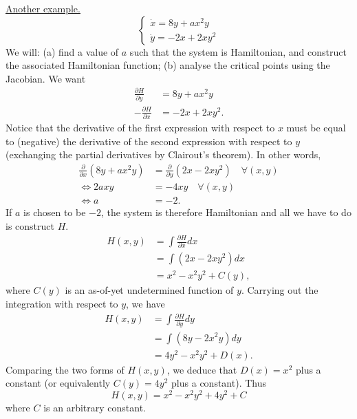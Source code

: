 \documentclass[11pt, letterpaper, oneside]{article}     %
\numberwithin{equation}{subsection}
\theoremstyle{definition}
\numberwithin{theorem}{section}
\theoremstyle{remark}
\begin{document}
\begin{enumerate}
  \medskip
  \underline{Another example.}
  \begin{equation}\label{eq:another-hamiltonian-system}
    \begin{cases}
      \dot x = 8y + ax^2y\\
      \dot y = -2x + 2xy^2
    \end{cases}
  \end{equation}
  We will: (a) find a value of $a$ such that the system is Hamiltonian, and construct the associated Hamiltonian function; (b) analyse the critical points using the Jacobian. We want
  \begin{align}
    \frac{\partial H}{\partial y} &= 8y + ax^2y\\
    -\frac{\partial H}{\partial x} &= -2x+2xy^2.
  \end{align}
  Notice that the derivative of the first expression with respect to $x$ must be equal to (negative) the derivative of the second expression with respect to $y$ (exchanging the partial derivatives by Clairout's theorem). In other words,
  \begin{align}
    \frac{\partial}{\partial x}\left(8y + ax^2y\right) &= \frac{\partial}{\partial y}\left(2x-2xy^2\right)\quad\forall (x,y)\\
    \iff 2axy &= -4xy\quad\forall(x,y)\\
    \iff a &= -2.
  \end{align}
  If $a$ is chosen to be $-2$, the system is therefore Hamiltonian and all we have to do is construct $H$.
  \begin{equation}
    \begin{split}
      H(x,y) &= \int\frac{\partial H}{\partial x}dx\\
      &= \int(2x-2xy^2)dx\\
      &= x^2 - x^2y^2 + C(y),
    \end{split}
  \end{equation}
  where $C(y)$ is an as-of-yet undetermined function of $y$. Carrying out the integration with respect to $y$, we have
  \begin{equation}
    \begin{split}
      H(x,y) &= \int\frac{\partial H}{\partial y}dy\\
      &= \int(8y - 2x^2y)dy\\
      &= 4y^2 - x^2y^2 + D(x).
    \end{split}
  \end{equation}
  Comparing the two forms of $H(x,y)$, we deduce that $D(x) = x^2$ plus a constant (or equivalently $C(y) = 4y^2$ plus a constant). Thus
  \begin{equation}
    H(x,y) = x^2 - x^2y^2 + 4y^2 + C
  \end{equation}
  where $C$ is an arbitrary constant.


\end{enumerate}
\end{document}
